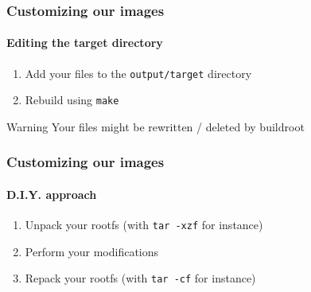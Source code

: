 \begin{frame}
  \frametitle{Customizing our images}
  \framesubtitle{Editing the target directory}
  \begin{enumerate}
    \item Add your files to the \texttt{output/target} directory
    \item Rebuild using \texttt{make}
  \end{enumerate}
  \begin{alertblock}{Warning}
    Your files might be rewritten / deleted by buildroot
  \end{alertblock}
\end{frame}
\begin{frame}
  \frametitle{Customizing our images}
  \framesubtitle{D.I.Y. approach}
  \begin{enumerate}
    \item Unpack your rootfs (with \texttt{tar -xzf} for instance)
    \item Perform your modifications
    \item Repack your rootfs (with \texttt{tar -cf} for instance)
  \end{enumerate}
\end{frame}


